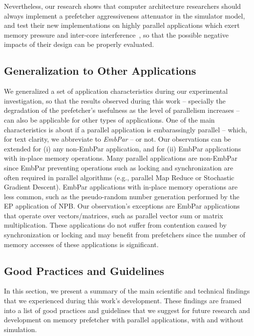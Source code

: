 \documentclass[AMA,final,STIX1COL]{WileyNJD-v2}
\begin{document}
Nevertheless, our research shows that computer architecture researchers should always implement a prefetcher aggressiveness attenuator in the simulator model, and test their new implementations on highly parallel applications which exert memory pressure and inter-core interference~\cite{ebrahimi2009coordinated}, so that the possible negative impacts of their design can be properly evaluated.


\subsection{Generalization to Other Applications}
\label{subsec:other_apps}

We generalized a set of application characteristics during our experimental investigation, so that the results observed during this work -- specially the degradation of the prefetcher's usefulness as the level of parallelism increases -- can also be applicable for other types of applications. 
One of the main characteristics is about if a parallel application is embarassingly parallel -- which, for text clarity, we abbreviate to \textit{EmbPar} -- or not. 
Our observations can be extended for (i) any non-EmbPar application, and for (ii) EmbPar applications with in-place memory operations. Many parallel applications are non-EmbPar since EmbPar preventing operations such as locking and synchronization are often required in parallel algorithms (e.g., parallel Map Reduce or Stochastic Gradient Descent). EmbPar applications with in-place memory operations are less common, such as the pseudo-random number generation performed by the EP application of NPB. Our observation's exceptions are EmbPar applications that operate over vectors/matrices, such as parallel vector sum or matrix multiplication. These applications do not suffer from contention caused by synchronization or locking and may benefit from prefetchers since the number of memory accesses of these applications is significant.


\subsection{Good Practices and Guidelines}
\label{subsec:practices_n_experiences}
In this section, we present a summary of the main scientific and technical findings that we experienced during this work's development. These findings are framed into a list of good practices and guidelines that we suggest for future research and development on memory prefetcher with parallel applications, with and without simulation.
\end{document}
